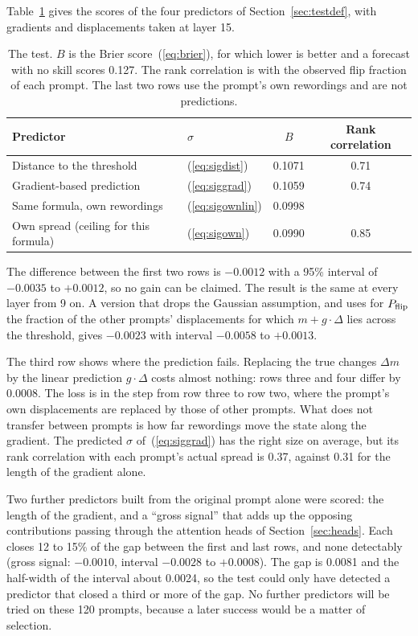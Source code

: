 \documentclass[11pt]{article}
\newcommand{\Dm}{\Delta m}
\begin{document}
Table~\ref{tab:headline} gives the scores of the four predictors of Section~\ref{sec:testdef}, with gradients and displacements taken at layer 15.

\begin{table}[ht]
\centering
\caption{The test. $B$ is the Brier score~(\ref{eq:brier}), for which lower is better and a forecast with no skill scores 0.127. The rank correlation is with the observed flip fraction of each prompt. The last two rows use the prompt's own rewordings and are not predictions.}
\label{tab:headline}
\begin{tabular}{llcc}
\toprule
Predictor & $\sigma$ & $B$ & Rank correlation \\
\midrule
Distance to the threshold & (\ref{eq:sigdist}) & 0.1071 & 0.71 \\
Gradient-based prediction & (\ref{eq:siggrad}) & 0.1059 & 0.74 \\
Same formula, own rewordings & (\ref{eq:sigownlin}) & 0.0998 & \\
Own spread (ceiling for this formula) & (\ref{eq:sigown}) & 0.0990 & 0.85 \\
\bottomrule
\end{tabular}
\end{table}

The difference between the first two rows is $-0.0012$ with a 95\% interval of $-0.0035$ to $+0.0012$, so no gain can be claimed. The result is the same at every layer from 9 on. A version that drops the Gaussian assumption, and uses for $P_{\rm flip}$ the fraction of the other prompts' displacements for which $m+g\cdot\Delta$ lies across the threshold, gives $-0.0023$ with interval $-0.0058$ to $+0.0013$.

The third row shows where the prediction fails. Replacing the true changes $\Dm$ by the linear prediction $g\cdot\Delta$ costs almost nothing: rows three and four differ by 0.0008. The loss is in the step from row three to row two, where the prompt's own displacements are replaced by those of other prompts. What does not transfer between prompts is how far rewordings move the state along the gradient. The predicted $\sigma$ of~(\ref{eq:siggrad}) has the right size on average, but its rank correlation with each prompt's actual spread is 0.37, against 0.31 for the length of the gradient alone.

Two further predictors built from the original prompt alone were scored: the length of the gradient, and a ``gross signal'' that adds up the opposing contributions passing through the attention heads of Section~\ref{sec:heads}. Each closes 12 to 15\% of the gap between the first and last rows, and none detectably (gross signal: $-0.0010$, interval $-0.0028$ to $+0.0008$). The gap is 0.0081 and the half-width of the interval about 0.0024, so the test could only have detected a predictor that closed a third or more of the gap. No further predictors will be tried on these 120 prompts, because a later success would be a matter of selection.
\end{document}

